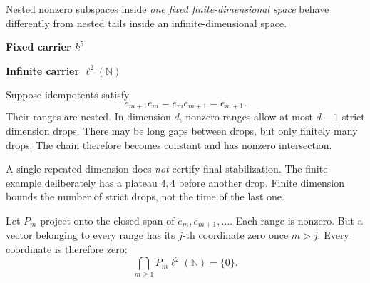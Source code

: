 
Nested nonzero subspaces inside \emph{one fixed finite-dimensional space} behave differently from nested tails inside an infinite-dimensional space.

\begin{minipage}[t]{.44\linewidth}\centering
{\sffamily\bfseries Fixed carrier $k^5$}\par\vspace{4pt}
\end{minipage}\hfill
\begin{minipage}[t]{.52\linewidth}\centering
{\sffamily\bfseries Infinite carrier $\ell^2(\mathbb N)$}\par\vspace{4pt}
\end{minipage}

Suppose idempotents satisfy
\[
e_{m+1}e_m=e_me_{m+1}=e_{m+1}.
\]
Their ranges are nested. In dimension $d$, nonzero ranges allow at most $d-1$ strict dimension drops. There may be long gaps between drops, but only finitely many drops. The chain therefore becomes constant and has nonzero intersection.

\begin{insight}
A single repeated dimension does \emph{not} certify final stabilization. The finite example deliberately has a plateau $4,4$ before another drop. Finite dimension bounds the number of strict drops, not the time of the last one.
\end{insight}

Let $P_m$ project onto the closed span of $e_m,e_{m+1},\ldots$. Each range is nonzero. But a vector belonging to every range has its $j$-th coordinate zero once $m>j$. Every coordinate is therefore zero:
\[
\bigcap_{m\ge1}P_m\ell^2(\mathbb N)=\{0\}.
\]

